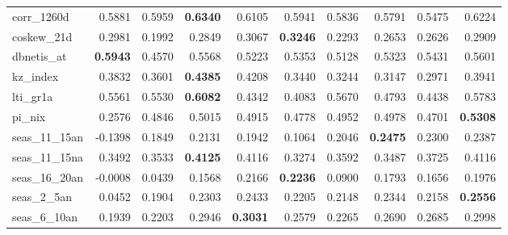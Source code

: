 \begin{longtable}{>{\raggedright\arraybackslash}p{2.6cm}rrrrrrrrr}
corr\_1260d & 0.5881 & \cellcolor{blue!10}0.5959 & \textbf{\cellcolor{blue!10}0.6340} & \cellcolor{blue!10}0.6105 & \cellcolor{blue!10}0.5941 & 0.5836 & 0.5791 & 0.5475 & \cellcolor{blue!10}0.6224 \\
coskew\_21d & 0.2981 & 0.1992 & 0.2849 & \cellcolor{blue!10}0.3067 & \textbf{\cellcolor{blue!10}0.3246} & 0.2293 & 0.2653 & 0.2626 & 0.2909 \\
dbnetis\_at & \textbf{0.5943} & 0.4570 & 0.5568 & 0.5223 & 0.5353 & 0.5128 & 0.5323 & 0.5431 & 0.5601 \\
kz\_index & 0.3832 & 0.3601 & \textbf{\cellcolor{blue!10}0.4385} & \cellcolor{blue!10}0.4208 & 0.3440 & 0.3244 & 0.3147 & 0.2971 & \cellcolor{blue!10}0.3941 \\
lti\_gr1a & 0.5561 & 0.5530 & \textbf{\cellcolor{blue!10}0.6082} & 0.4342 & 0.4083 & \cellcolor{blue!10}0.5670 & 0.4793 & 0.4438 & \cellcolor{blue!10}0.5783 \\
pi\_nix & 0.2576 & \cellcolor{blue!10}0.4846 & \cellcolor{blue!10}0.5015 & \cellcolor{blue!10}0.4915 & \cellcolor{blue!10}0.4778 & \cellcolor{blue!10}0.4952 & \cellcolor{blue!10}0.4978 & \cellcolor{blue!10}0.4701 & \textbf{\cellcolor{blue!10}0.5308} \\
seas\_11\_15an & -0.1398 & \cellcolor{blue!10}0.1849 & \cellcolor{blue!10}0.2131 & \cellcolor{blue!10}0.1942 & \cellcolor{blue!10}0.1064 & \cellcolor{blue!10}0.2046 & \textbf{\cellcolor{blue!10}0.2475} & \cellcolor{blue!10}0.2300 & \cellcolor{blue!10}0.2387 \\
seas\_11\_15na & 0.3492 & \cellcolor{blue!10}0.3533 & \textbf{\cellcolor{blue!10}0.4125} & \cellcolor{blue!10}0.4116 & 0.3274 & \cellcolor{blue!10}0.3592 & 0.3487 & \cellcolor{blue!10}0.3725 & \cellcolor{blue!10}0.4116 \\
seas\_16\_20an & -0.0008 & \cellcolor{blue!10}0.0439 & \cellcolor{blue!10}0.1568 & \cellcolor{blue!10}0.2166 & \textbf{\cellcolor{blue!10}0.2236} & \cellcolor{blue!10}0.0900 & \cellcolor{blue!10}0.1793 & \cellcolor{blue!10}0.1656 & \cellcolor{blue!10}0.1976 \\
seas\_2\_5an & 0.0452 & \cellcolor{blue!10}0.1904 & \cellcolor{blue!10}0.2303 & \cellcolor{blue!10}0.2433 & \cellcolor{blue!10}0.2205 & \cellcolor{blue!10}0.2148 & \cellcolor{blue!10}0.2344 & \cellcolor{blue!10}0.2158 & \textbf{\cellcolor{blue!10}0.2556} \\
seas\_6\_10an & 0.1939 & \cellcolor{blue!10}0.2203 & \cellcolor{blue!10}0.2946 & \textbf{\cellcolor{blue!10}0.3031} & \cellcolor{blue!10}0.2579 & \cellcolor{blue!10}0.2265 & \cellcolor{blue!10}0.2690 & \cellcolor{blue!10}0.2685 & \cellcolor{blue!10}0.2998 \\

\end{longtable}
